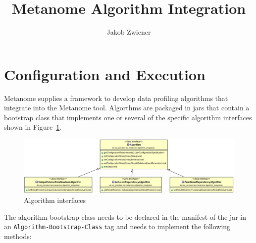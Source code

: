 \documentclass[10pt,a4paper]{article}
\author{Jakob Zwiener}
\title{Metanome Algorithm Integration}
\begin{document}
\maketitle

\section{Configuration and Execution}
\label{sec_configurationAndExecution}

Metanome supplies a framework to develop data profiling algorithms that integrate into the Metanome tool. Algorthms are packaged in jars that contain a bootstrap class that implements one or several of the specific algorithm interfaces shown in Figure~\ref{fig_algorithmClass}.
\begin{figure}[h]
\includegraphics[width=\textwidth]{algorithm_class}
\caption{Algorithm interfaces}
\label{fig_algorithmClass}
\end{figure}
The algorithm bootstrap class needs to be declared in the manifest of the jar in an \texttt{Algorithm-Bootstrap-Class} tag and needs to implement the following methods:
\end{document}
